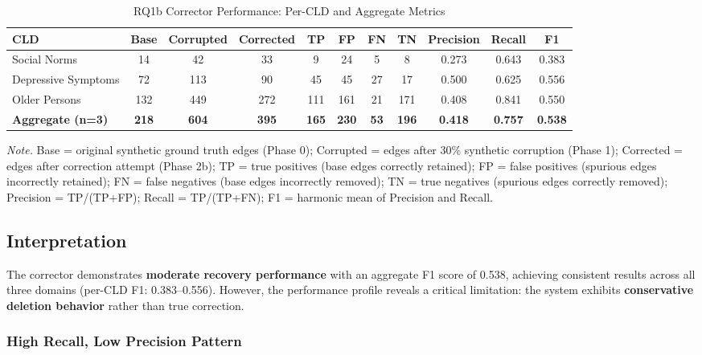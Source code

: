 \begin{table}[htbp]
\centering
\caption{RQ1b Corrector Performance: Per-CLD and Aggregate Metrics}
\label{tab:rq1b_correction_metrics}
\begin{tabular}{lcccccccccc}
\toprule
\textbf{CLD} & \textbf{Base} & \textbf{Corrupted} & \textbf{Corrected} & \textbf{TP} & \textbf{FP} & \textbf{FN} & \textbf{TN} & \textbf{Precision} & \textbf{Recall} & \textbf{F1} \\
\midrule
Social Norms & 14 & 42 & 33 & 9 & 24 & 5 & 8 & 0.273 & 0.643 & 0.383 \\
Depressive Symptoms & 72 & 113 & 90 & 45 & 45 & 27 & 17 & 0.500 & 0.625 & 0.556 \\
Older Persons & 132 & 449 & 272 & 111 & 161 & 21 & 171 & 0.408 & 0.841 & 0.550 \\
\midrule
\textbf{Aggregate (n=3)} & \textbf{218} & \textbf{604} & \textbf{395} & \textbf{165} & \textbf{230} & \textbf{53} & \textbf{196} & \textbf{0.418} & \textbf{0.757} & \textbf{0.538} \\
\bottomrule
\end{tabular}
\begin{tablenotes}
\small
\item \textit{Note.} Base = original synthetic ground truth edges (Phase 0); Corrupted = edges after 30\% synthetic corruption (Phase 1); Corrected = edges after correction attempt (Phase 2b); TP = true positives (base edges correctly retained); FP = false positives (spurious edges incorrectly retained); FN = false negatives (base edges incorrectly removed); TN = true negatives (spurious edges correctly removed); Precision = TP/(TP+FP); Recall = TP/(TP+FN); F1 = harmonic mean of Precision and Recall.
\end{tablenotes}
\end{table}

\subsection{Interpretation}

The corrector demonstrates \textbf{moderate recovery performance} with an aggregate F1 score of 0.538, achieving consistent results across all three domains (per-CLD F1: 0.383--0.556). However, the performance profile reveals a critical limitation: the system exhibits \textbf{conservative deletion behavior} rather than true correction.

\subsubsection{High Recall, Low Precision Pattern}

